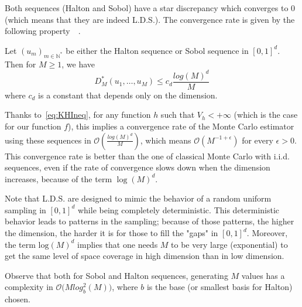 Both sequences (Halton and Sobol) have a star discrepancy which converges to $0$ (which means that they are indeed L.D.S.). The convergence rate is given by the following property~\citep{niederreiter1988low}~\citep{owen2019monte}.
\begin{Prop}
Let $(u_m)_{m\in\mathbb{N}^*}$ be either the Halton sequence or Sobol sequence in $[0,1]^d$. Then for $M\geq 1$, we have
$$D_M^{*}(u_1,\hdots,u_M)\leq c_d \frac{log(M)^d}{M}$$
where $c_d$ is a constant that depends only on the dimension.
\end{Prop}
Thanks to~\autoref{eq:KHIneq}, {for any function $h$ such that $V_h<+\infty$ (which is the case for our function $f$)}, this implies  a convergence rate of the Monte Carlo estimator using these sequences in $\mathcal{O}(\frac{log(M)^d}{M})$, which means $\mathcal{O}(M^{-1+\epsilon})$ for every $\epsilon >0$. This convergence rate  is better than the one of classical Monte Carlo with i.i.d. sequences, {even if the rate of convergence slows down when the dimension increases, because of the term $\log(M)^d$.} 
{
\begin{Rk}
Note that L.D.S. are designed to mimic the behavior of a random uniform sampling in $[0,1]^d$ while being completely deterministic. This deterministic behavior leads to patterns in the sampling; because of those patterns, the higher the dimension, the harder it is for those to fill the "gaps" in $[0,1]^d$.
Moreover, the term $\text{log}(M)^d$ implies that one needs $M$ to be very large (exponential) to get the same level of space coverage in high dimension than in low dimension.
\end{Rk}
}
{
\begin{Rk}
Observe that both for Sobol and Halton sequences, {generating $M$ values} has a complexity in $\mathcal{O}\big(M log_b^2(M)\big)$, where $b$ is the base (or smallest basis for Halton) chosen.
\end{Rk}
}


